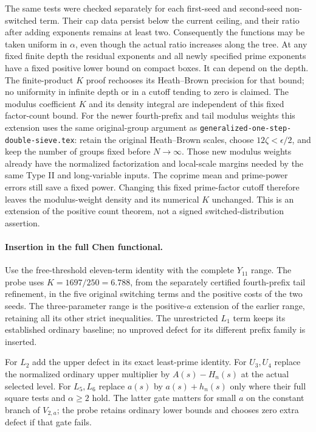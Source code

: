The same tests were checked separately for each first-seed and
second-seed non-switched term. Their cap data persist below the
current ceiling, and their ratio after adding exponents remains
at least two. Consequently the functions may be taken uniform in
$\alpha$, even though the actual ratio increases along the tree.
At any fixed finite depth the residual exponents and all newly
specified prime exponents have a fixed positive lower bound on
compact boxes. It can depend on the depth. The finite-product $K$
proof rechooses its Heath--Brown precision for that bound; no
uniformity in infinite depth or in a cutoff tending to zero is
claimed. The modulus coefficient $K$ and its density integral are
independent of this fixed factor-count bound.
For the newer fourth-prefix and tail modulus weights this extension
uses the same original-group argument as
\texttt{generalized-one-step-double-sieve.tex}: retain the original
Heath--Brown scales, choose $12\zeta<\epsilon/2$, and keep the number
of groups fixed before $N\to\infty$. Those new modulus weights
already have the normalized factorization and local-scale margins
needed by the same Type II and long-variable inputs. The coprime
mean and prime-power errors still save a fixed power. Changing this
fixed prime-factor cutoff therefore leaves the modulus-weight density
and its numerical $K$ unchanged. This is an extension of the positive
count theorem, not a signed switched-distribution assertion.

\paragraph{Insertion in the full Chen functional.}
Use the free-threshold eleven-term identity with the complete
$Y_{11}$ range. The probe uses $K=1697/250=6.788$, from the separately
certified fourth-prefix tail refinement, in the five original
switching terms and the positive costs of the two seeds.
The three-parameter range is the positive-$a$ extension of the
earlier range, retaining all its other strict inequalities.
The unrestricted $L_1$ term keeps its established ordinary baseline;
no unproved defect for its different prefix family is inserted.

For $L_2$ add the upper defect in its exact least-prime identity.
For $U_3,U_4$ replace the normalized ordinary upper multiplier by
$A(s)-H_n(s)$ at the actual selected level. For $L_5,L_6$ replace
$a(s)$ by $a(s)+h_n(s)$ only where their full square tests and
$\alpha\ge2$ hold. The latter gate matters for small $a$ on the
constant branch of $V_{2,a}$; the probe retains ordinary lower
bounds and chooses zero extra defect if that gate fails.

